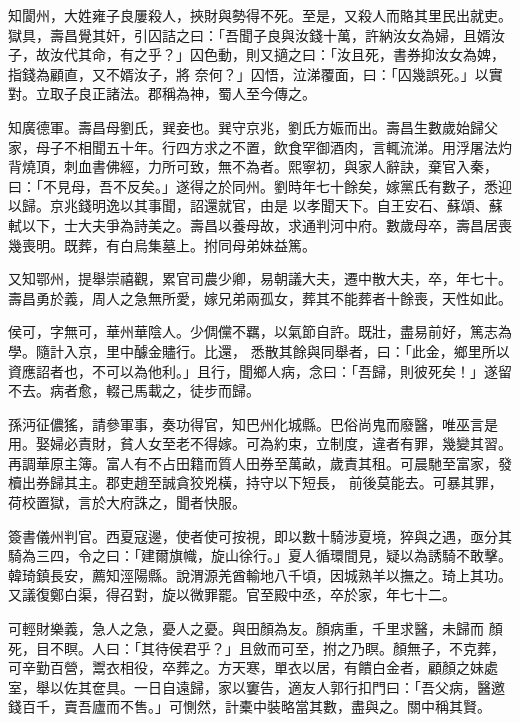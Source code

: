 \begin{pinyinscope}
 知閬州，大姓雍子良屢殺人，挾財與勢得不死。至是，又殺人而賂其里民出就吏。獄具，壽昌覺其奸，引囚詰之曰：「吾聞子良與汝錢十萬，許納汝女為婦，且婿汝子，故汝代其命，有之乎？」囚色動，則又擿之曰：「汝且死，書券抑汝女為婢，指錢為顧直，又不婿汝子，將
 奈何？」囚悟，泣涕覆面，曰：「囚幾誤死。」以實對。立取子良正諸法。郡稱為神，蜀人至今傳之。



 知廣德軍。壽昌母劉氏，巽妾也。巽守京兆，劉氏方娠而出。壽昌生數歲始歸父家，母子不相聞五十年。行四方求之不置，飲食罕御酒肉，言輒流涕。用浮屠法灼背燒頂，刺血書佛經，力所可致，無不為者。熙寧初，與家人辭訣，棄官入秦，曰：「不見母，吾不反矣。」遂得之於同州。劉時年七十餘矣，嫁黨氏有數子，悉迎以歸。京兆錢明逸以其事聞，詔還就官，由是
 以孝聞天下。自王安石、蘇頌、蘇軾以下，士大夫爭為詩美之。壽昌以養母故，求通判河中府。數歲母卒，壽昌居喪幾喪明。既葬，有白烏集墓上。拊同母弟妹益篤。



 又知鄂州，提舉崇禧觀，累官司農少卿，易朝議大夫，遷中散大夫，卒，年七十。壽昌勇於義，周人之急無所愛，嫁兄弟兩孤女，葬其不能葬者十餘喪，天性如此。



 侯可，字無可，華州華陰人。少倜儻不羈，以氣節自許。既壯，盡易前好，篤志為學。隨計入京，里中醵金贐行。比還，
 悉散其餘與同舉者，曰：「此金，鄉里所以資應詔者也，不可以為他利。」且行，聞鄉人病，念曰：「吾歸，則彼死矣！」遂留不去。病者愈，輟己馬載之，徒步而歸。



 孫沔征儂猺，請參軍事，奏功得官，知巴州化城縣。巴俗尚鬼而廢醫，唯巫言是用。娶婦必責財，貧人女至老不得嫁。可為約束，立制度，違者有罪，幾變其習。再調華原主簿。富人有不占田籍而質人田券至萬畝，歲責其租。可晨馳至富家，發櫝出券歸其主。郡吏趙至誠貪狡兇橫，持守以下短長，
 前後莫能去。可暴其罪，荷校置獄，言於大府誅之，聞者快服。



 簽書儀州判官。西夏寇邊，使者使可按視，即以數十騎涉夏境，猝與之遇，亟分其騎為三四，令之曰：「建爾旗幟，旋山徐行。」夏人循環間見，疑以為誘騎不敢擊。韓琦鎮長安，薦知涇陽縣。說渭源羌酋輸地八千頃，因城熟羊以撫之。琦上其功。又議復鄭白渠，得召對，旋以微罪罷。官至殿中丞，卒於家，年七十二。



 可輕財樂義，急人之急，憂人之憂。與田顏為友。顏病重，千里求醫，未歸而
 顏死，目不瞑。人曰：「其待侯君乎？」且斂而可至，拊之乃瞑。顏無子，不克葬，可辛勤百營，鬻衣相役，卒葬之。方天寒，單衣以居，有饋白金者，顧顏之妹處室，舉以佐其奩具。一日自遠歸，家以窶告，適友人郭行扣門曰：「吾父病，醫邀錢百千，賣吾廬而不售。」可惻然，計橐中裝略當其數，盡與之。關中稱其賢。




\end{pinyinscope}
